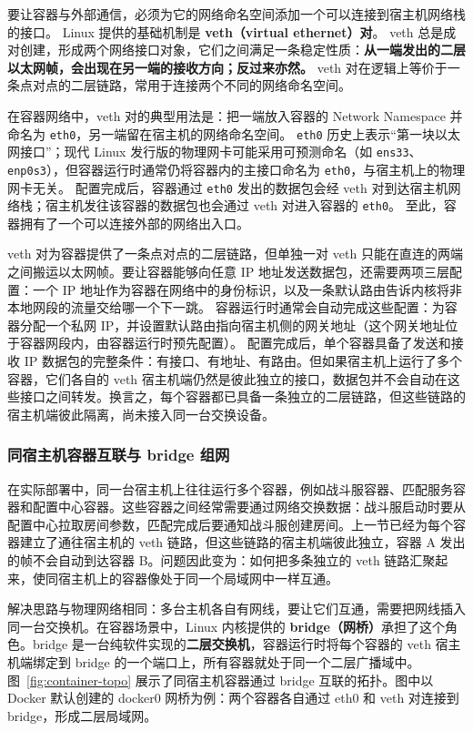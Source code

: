 要让容器与外部通信，必须为它的网络命名空间添加一个可以连接到宿主机网络栈的接口。
Linux 提供的基础机制是 \textbf{veth（virtual ethernet）对}。
veth 总是成对创建，形成两个网络接口对象，它们之间满足一条稳定性质：\textbf{从一端发出的二层以太网帧，会出现在另一端的接收方向；反过来亦然。}
veth 对在逻辑上等价于一条点对点的二层链路，常用于连接两个不同的网络命名空间。

在容器网络中，veth 对的典型用法是：把一端放入容器的 Network Namespace 并命名为 \texttt{eth0}，另一端留在宿主机的网络命名空间。
\texttt{eth0} 历史上表示“第一块以太网接口”；现代 Linux 发行版的物理网卡可能采用可预测命名（如 \texttt{ens33}、\texttt{enp0s3}），但容器运行时通常仍将容器内的主接口命名为 \texttt{eth0}，与宿主机上的物理网卡无关。
配置完成后，容器通过 \texttt{eth0} 发出的数据包会经 veth 对到达宿主机网络栈；宿主机发往该容器的数据包也会通过 veth 对进入容器的 \texttt{eth0}。
至此，容器拥有了一个可以连接外部的网络出入口。

veth 对为容器提供了一条点对点的二层链路，但单独一对 veth 只能在直连的两端之间搬运以太网帧。要让容器能够向任意 IP 地址发送数据包，还需要两项三层配置：一个 IP 地址作为容器在网络中的身份标识，以及一条默认路由告诉内核将非本地网段的流量交给哪一个下一跳。
容器运行时通常会自动完成这些配置：为容器分配一个私网 IP，并设置默认路由指向宿主机侧的网关地址（这个网关地址位于容器网段内，由容器运行时预先配置）。
配置完成后，单个容器具备了发送和接收 IP 数据包的完整条件：有接口、有地址、有路由。但如果宿主机上运行了多个容器，它们各自的 veth 宿主机端仍然是彼此独立的接口，数据包并不会自动在这些接口之间转发。换言之，每个容器都已具备一条独立的二层链路，但这些链路的宿主机端彼此隔离，尚未接入同一台交换设备。


\subsubsection{同宿主机容器互联与 bridge 组网}

在实际部署中，同一台宿主机上往往运行多个容器，例如战斗服容器、匹配服务容器和配置中心容器。这些容器之间经常需要通过网络交换数据：战斗服启动时要从配置中心拉取房间参数，匹配完成后要通知战斗服创建房间。上一节已经为每个容器建立了通往宿主机的 veth 链路，但这些链路的宿主机端彼此独立，容器 A 发出的帧不会自动到达容器 B。问题因此变为：如何把多条独立的 veth 链路汇聚起来，使同宿主机上的容器像处于同一个局域网中一样互通。

解决思路与物理网络相同：多台主机各自有网线，要让它们互通，需要把网线插入同一台交换机。在容器场景中，Linux 内核提供的 \textbf{bridge（网桥）}承担了这个角色。bridge 是一台纯软件实现的\textbf{二层交换机}，容器运行时将每个容器的 veth 宿主机端绑定到 bridge 的一个端口上，所有容器就处于同一个二层广播域中。图~\ref{fig:container-topo} 展示了同宿主机容器通过 bridge 互联的拓扑。图中以 Docker 默认创建的 docker0 网桥为例：两个容器各自通过 eth0 和 veth 对连接到 bridge，形成二层局域网。


